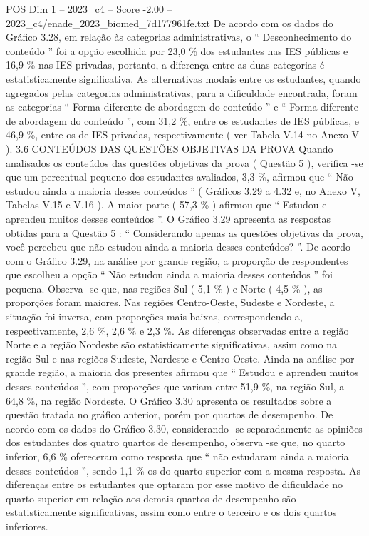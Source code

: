 \begin{textsample}{POS Dim 1 – 2023\_c4 – Score -2.00 – 2023\_c4/enade\_2023\_biomed\_7d177961fe.txt}
De acordo com os dados do Gráfico 3.28, em relação às categorias administrativas, o “ Desconhecimento do conteúdo ” foi a opção escolhida por 23,0 \% dos estudantes nas IES públicas e 16,9 \% nas IES privadas, portanto, a diferença entre as duas categorias é estatisticamente significativa.
As alternativas modais entre os estudantes, quando agregados pelas categorias administrativas, para a dificuldade encontrada, foram as categorias “ Forma diferente de abordagem do conteúdo ” e “ Forma diferente de abordagem do conteúdo ”, com 31,2 \%, entre os estudantes de IES públicas, e 46,9 \%, entre os de IES privadas, respectivamente ( ver Tabela V.14 no Anexo V ). 3.6 CONTEÚDOS DAS QUESTÕES OBJETIVAS DA PROVA Quando analisados os conteúdos das questões objetivas da prova ( Questão 5 ), verifica -se que um percentual pequeno dos estudantes avaliados, 3,3 \%, afirmou que “ Não estudou ainda a maioria desses conteúdos ” ( Gráficos 3.29 a 4.32 e, no Anexo V, Tabelas V.15 e V.16 ).
A maior parte ( 57,3 \% ) afirmou que “ Estudou e aprendeu muitos desses conteúdos ”.
O Gráfico 3.29 apresenta as respostas obtidas para a Questão 5 : “ Considerando apenas as questões objetivas da prova, você percebeu que não estudou ainda a maioria desses conteúdos? ”.
De acordo com o Gráfico 3.29, na análise por grande região, a proporção de respondentes que escolheu a opção “ Não estudou ainda a maioria desses conteúdos ” foi pequena.
Observa -se que, nas regiões Sul ( 5,1 \% ) e Norte ( 4,5 \% ), as proporções foram maiores.
Nas regiões Centro-Oeste, Sudeste e Nordeste, a situação foi inversa, com proporções mais baixas, correspondendo a, respectivamente, 2,6 \%, 2,6 \% e 2,3 \%.
As diferenças observadas entre a região Norte e a região Nordeste são estatisticamente significativas, assim como na região Sul e nas regiões Sudeste, Nordeste e Centro-Oeste.
Ainda na análise por grande região, a maioria dos presentes afirmou que “ Estudou e aprendeu muitos desses conteúdos ”, com proporções que variam entre 51,9 \%, na região Sul, a 64,8 \%, na região Nordeste.
O Gráfico 3.30 apresenta os resultados sobre a questão tratada no gráfico anterior, porém por quartos de desempenho.
De acordo com os dados do Gráfico 3.30, considerando -se separadamente as opiniões dos estudantes dos quatro quartos de desempenho, observa -se que, no quarto inferior, 6,6 \% ofereceram como resposta que “ não estudaram ainda a maioria desses conteúdos ”, sendo 1,1 \% os do quarto superior com a mesma resposta.
As diferenças entre os estudantes que optaram por esse motivo de dificuldade no quarto superior em relação aos demais quartos de desempenho são estatisticamente significativas, assim como entre o terceiro e os dois quartos inferiores.

\end{textsample}
